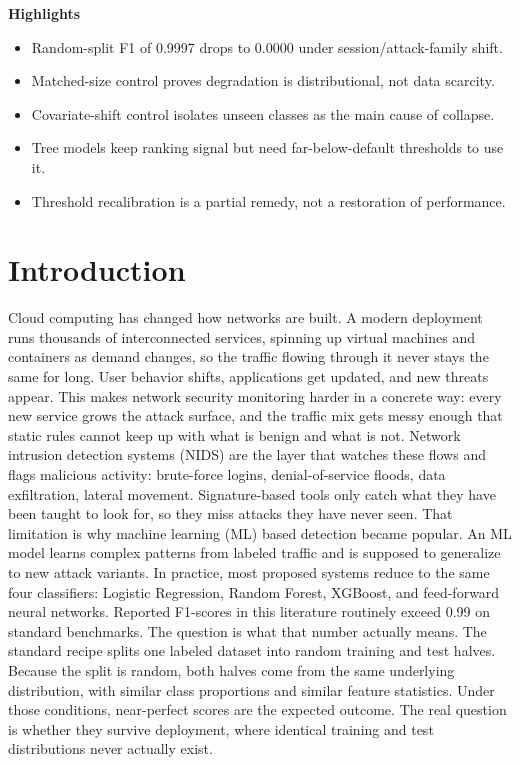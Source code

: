 \documentclass[10pt]{article}
\begin{document}
\noindent\textbf{Highlights}
\begin{itemize}
\item Random-split F1 of 0.9997 drops to 0.0000 under session/attack-family shift.
\item Matched-size control proves degradation is distributional, not data scarcity.
\item Covariate-shift control isolates unseen classes as the main cause of collapse.
\item Tree models keep ranking signal but need far-below-default thresholds to use it.
\item Threshold recalibration is a partial remedy, not a restoration of performance.
\end{itemize}

\section{Introduction}
Cloud computing has changed how networks are built. A modern deployment runs thousands of interconnected services, spinning up virtual machines and containers as demand changes, so the traffic flowing through it never stays the same for long. User behavior shifts, applications get updated, and new threats appear. This makes network security monitoring harder in a concrete way: every new service grows the attack surface, and the traffic mix gets messy enough that static rules cannot keep up with what is benign and what is not.
Network intrusion detection systems (NIDS) are the layer that watches these flows and flags malicious activity: brute-force logins, denial-of-service floods, data exfiltration, lateral movement. Signature-based tools only catch what they have been taught to look for, so they miss attacks they have never seen. That limitation is why machine learning (ML) based detection became popular. An ML model learns complex patterns from labeled traffic and is supposed to generalize to new attack variants. In practice, most proposed systems reduce to the same four classifiers: Logistic Regression, Random Forest, XGBoost, and feed-forward neural networks. Reported F1-scores in this literature routinely exceed 0.99 on standard benchmarks.
The question is what that number actually means. The standard recipe splits one labeled dataset into random training and test halves. Because the split is random, both halves come from the same underlying distribution, with similar class proportions and similar feature statistics. Under those conditions, near-perfect scores are the expected outcome. The real question is whether they survive deployment, where identical training and test distributions never actually exist.
\end{document}

